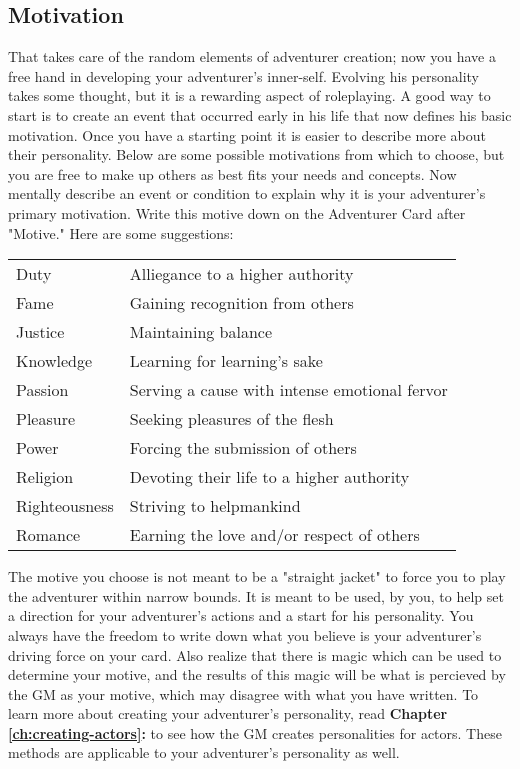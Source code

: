 \begin{multicols}{2}
\section{Motivation}
That takes care of the random elements of adventurer creation; now you have a free hand in developing your adventurer’s inner-self. Evolving his personality takes some thought, but it is a rewarding aspect of roleplaying. A good way to start is to create an event that occurred early in his life that now defines his basic motivation. Once you have a starting point it is easier to describe more about their personality.
Below are some possible motivations from which to choose, but you are free to make up others as best fits your needs and concepts. Now mentally describe an event or condition to explain why it is your adventurer's primary motivation. Write this motive down on the Adventurer Card after "Motive." Here are some suggestions:

\begin{tabular}{l l}
Duty & Alliegance to a higher authority\\
Fame & Gaining recognition from others\\
Justice & Maintaining balance\\
Knowledge & Learning for learning’s sake\\
Passion & Serving a cause with intense emotional fervor\\
Pleasure & Seeking pleasures of the flesh\\
Power & Forcing the submission of others\\
Religion & Devoting their life to a higher authority\\
Righteousness & Striving to helpmankind\\
Romance & Earning the love and/or respect of others
\end{tabular}

The motive you choose is not meant to be a "straight jacket" to force you to play the adventurer within narrow bounds. It is meant to be used, by you, to help set a direction for your adventurer’s actions and a start for his personality. You always have the freedom to write down what you believe is your adventurer’s driving force on your card. Also realize that there is magic which can be used to determine your motive, and the results of this magic will be what is percieved by the GM as your motive, which may disagree with what you have written.
To learn more about creating your adventurer's personality, read \textbf{Chapter \ref{ch:creating-actors}: } to see how the GM creates personalities for actors. These methods are applicable to your adventurer’s personality as well.

\end{multicols}
